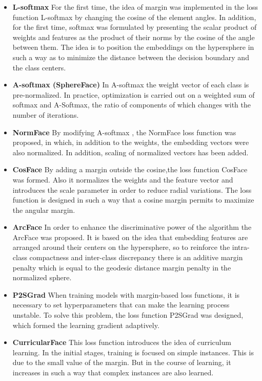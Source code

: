 \documentclass[11pt,a4paper]{article}
\begin{document}
\begin{itemize}
\item{\bf{L-softmax}}
For the first time, the idea of margin was implemented in the loss function L-softmax \cite{Lsoftmax} by changing the cosine of the element angles. In addition, for the first time, softmax \cite{softmax} was formulated by presenting the scalar product of weights and features as the product of their norms by the cosine of the angle between them.
The idea is to position the embeddings on the hypersphere in such a way as to minimize the distance between the decision boundary and the class centers.
\item{\bf{A-softmax (SphereFace)}}
In A-softmax \cite{sphereface} the weight vector of each class is pre-normalized. In practice, optimization is carried out on a weighted sum of softmax and A-Softmax, the ratio of components of which changes with the number of iterations.
\item{\bf{NormFace}}
By modifying A-softmax \cite{sphereface}, the NormFace \cite{Normface} loss function was proposed, in which, in addition to the weights, the embedding vectors were also normalized. In addition, scaling of normalized vectors has been added.
\item{\bf{CosFace}}
By adding a margin outside the cosine,the loss function CosFace \cite{cosface} was formed. Also it normalizes the weights and the feature vector and introduces the scale parameter in order to reduce radial variations. The loss function is designed in such a way that a cosine margin permits to maximize the angular margin.
\item{\bf{ArcFace}}
In order to enhance the discriminative power of the algorithm the ArcFace \cite{arcface} was proposed. It is based on the idea that embedding features are arranged around their centers on the hypersphere, so to reinforce the intra-class compactness and inter-class discrepancy there is an additive margin penalty which is equal to the geodesic distance margin penalty in the normalized sphere. 
\item{\bf{P2SGrad}}
When training models with margin-based loss functions, it is necessary to set hyperparameters that can make the learning process unstable. To solve this problem, the loss function P2SGrad \cite{ps2grad} was designed, which formed the learning gradient adaptively.
\item{\bf{CurricularFace}}
This loss function \cite{curricularFace} introduces the idea of curriculum learning. In the initial stages, training is focused on simple instances. This is due to the small value of the margin. But in the course of learning, it increases in such a way that complex instances are also learned.

\end{itemize}
\end{document}
